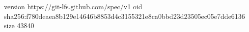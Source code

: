 version https://git-lfs.github.com/spec/v1
oid sha256:f780deaea8b129e14646b8853d4c3155321e8ca0bbd23d23505ec05e7dde6136
size 43840
